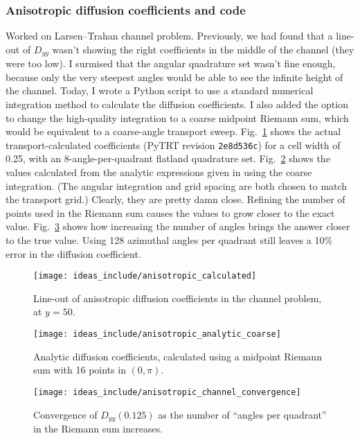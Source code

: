\documentclass[11pt]{SRJresearch}
\newcommand{\pyrev}[1]{\textsf{PyTRT} revision \texttt{#1}}
\begin{document}
\subsubsection{Anisotropic diffusion coefficients and code}
Worked on Larsen--Trahan channel problem. Previously, we had found that a
line-out of $D_{yy}$ wasn't showing the right coefficients in the middle of the
channel (they were too low). I surmised that the angular quadrature set wasn't
fine enough, because only the very steepest angles would be able to see the
infinite height of the channel. Today, I wrote a Python script to use a
standard numerical integration method to calculate the diffusion coefficients.
I also added the option to change the high-quality integration to a coarse
midpoint Riemann sum, which would be equivalent to a coarse-angle transport
sweep. Fig.~\ref{fig:anisotropicCalculated} shows the actual
transport-calculated coefficients (\pyrev{2e8d536c}) for
a cell width of 0.25, with an 8-angle-per-quadrant flatland quadrature set.
Fig.~\ref{fig:anisotropicAnalyticCoarse} shows the values calculated from the
analytic expressions given in \cite{Lar2009c} using the coarse integration.
(The angular integration and grid spacing are both chosen to match the
transport grid.) Clearly, they are pretty damn close. Refining the number of
points used in the Riemann sum causes the values to grow closer to the exact
value. Fig.~\ref{fig:anisotropicChannelConvergence} shows how increasing the
number of angles brings the answer closer to the true value. Using 128
azimuthal angles per quadrant still leaves a 10\% error in the diffusion
coefficient.

\begin{figure}[htb]
  \centering
  \texttt{[image: ideas\_include/anisotropic\_calculated]}
  \caption{Line-out of anisotropic diffusion coefficients in the channel
  problem, at $y=50$.}
  \label{fig:anisotropicCalculated}
\end{figure}

\begin{figure}[htb]
  \centering
  \texttt{[image: ideas\_include/anisotropic\_analytic\_coarse]}
  \caption{Analytic diffusion coefficients, calculated using a midpoint Riemann
  sum with 16 points in $(0,\pi)$.}
  \label{fig:anisotropicAnalyticCoarse}
\end{figure}

\begin{figure}[htb]
  \centering
  \texttt{[image: ideas\_include/anisotropic\_channel\_convergence]}
  \caption{Convergence of $D_{yy}(0.125)$ as the number of ``angles per
  quadrant'' in the Riemann sum increases.}
  \label{fig:anisotropicChannelConvergence}
\end{figure}
\end{document}
